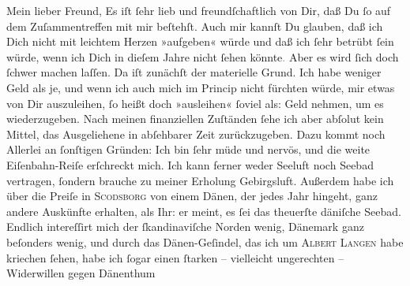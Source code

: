 \pstart{}Mein lieber Freund,\pend\vspace{0.5em}
\pstart
           Es iſt{ }ſehr lieb und freundſchaftlich von Dir, daß Du{ }ſo auf dem Zuſammentreffen mit
               mir beſtehſt. Auch mir kannſt Du glauben, daß ich Dich nicht mit leichtem Herzen
               »aufgeben« würde und daß ich{ }ſehr betrübt{ }ſein würde, wenn ich Dich in dieſem Jahre
               nicht{ }ſehen könnte\textcolor{gray}{.} Aber es wird{ }ſich doch{ }ſchwer machen laſſen.
               Da iſt zunächſt der materielle Grund. Ich habe weniger Geld als je, {\pb}und wenn ich auch mich im Princip nicht  fürchten würde, mir etwas von Dir auszuleihen,{ }ſo
               heißt doch »ausleihen«{ }ſoviel\strikeout{,} als: Geld nehmen, um
               es wiederzugeben. Nach meinen \label{T_L02778-1v}\label{T_L02778-1} finanziellen Zuſtänden{ }ſehe ich aber abſolut
               kein Mittel,  das Ausgeliehene in abſehbarer Zeit
               zurückzugeben. Dazu kommt noch Allerlei an{ }ſonſtigen Gründen: Ich bin{ }ſehr müde und
               nervös, und die weite Eiſenbahn-Reiſe erſchreckt mich. {\pb}Ich kann ferner weder Seeluft noch  Seebad vertragen,{ }ſondern brauche zu meiner Erholung Gebirgsluft. Außerdem
               habe ich über die Preiſe in \textsc{Scodsborg} von einem Dänen, der
               jedes Jahr hingeht, ganz andere Auskünfte erhalten, als Ihr: er meint, es{ }ſei das
               theuerſte däniſche Seebad. Endlich  intereſſirt mich der ſkandinaviſche Norden
               wenig, Dänemark ganz beſonders wenig, {\pb}und durch das Dänen-Geſindel, das ich um \textsc{Albert Langen} habe kriechen{ }ſehen, habe ich{ }ſogar einen{ }ſtarken – vielleicht ungerechten –
               Widerwillen gegen Dänenthum
